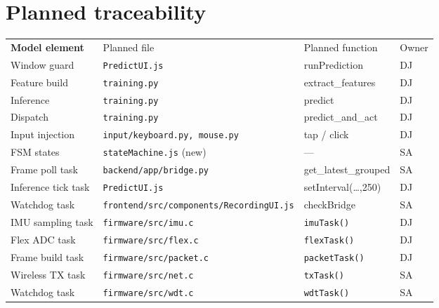 \documentclass[11pt,a4paper]{article}
\newcommand{\hdrow}[1]{\rowcolor{headbg}\color{headfg}\bfseries #1}
\begin{document}
\section{Planned traceability}
\begin{tabularx}{\textwidth}{@{}X p{4.6cm}p{3.6cm}p{1.0cm}@{}}
\hdrow{Model element & Planned file & Planned function & Owner} \\[1pt]
Window guard & \texttt{PredictUI.js} & runPrediction & DJ \\
Feature build & \texttt{training.py} & extract\_features & DJ \\
Inference & \texttt{training.py} & predict & DJ \\
Dispatch & \texttt{training.py} & predict\_and\_act & DJ \\
Input injection & \texttt{input/keyboard.py, mouse.py} & tap / click & DJ \\
FSM states & \texttt{stateMachine.js} (new) & --- & SA \\
Frame poll task & \texttt{backend/app/bridge.py} & get\_latest\_grouped & SA \\
Inference tick task & \texttt{PredictUI.js} & setInterval(…,250) & DJ \\
Watchdog task & \texttt{frontend/src/components/RecordingUI.js} & checkBridge & SA \\
IMU sampling task & \texttt{firmware/src/imu.c} & \texttt{imuTask()} & DJ \\
Flex ADC task & \texttt{firmware/src/flex.c} & \texttt{flexTask()} & DJ \\
Frame build task & \texttt{firmware/src/packet.c} & \texttt{packetTask()} & DJ \\
Wireless TX task & \texttt{firmware/src/net.c} & \texttt{txTask()} & SA \\
Watchdog task & \texttt{firmware/src/wdt.c} & \texttt{wdtTask()} & SA \\
\end{tabularx}

\end{document}
